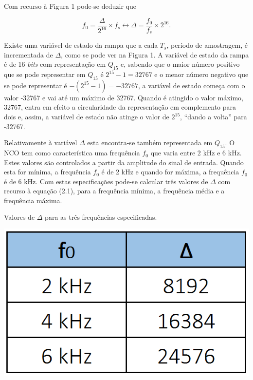 \documentclass[11pt]{article}
\numberwithin{equation}{section}
\begin{document}
Com recurso à Figura 1 pode-se deduzir que

\vspace{-3mm}
\begin{equation}
f_{0} = \frac{\Delta}{2^{16}} \times f_{s} \leftrightarrow \Delta = \frac{f_{0}}{f_{s}} \times 2^{16}.
\end{equation}

\vspace{1mm}
Existe uma variável de estado da rampa que a cada $T_{s}$, período de amostragem, é incrementada de $\Delta$, como se pode ver na Figura 1. A variável de estado da rampa é de 16 \textit{bits} com representação em $Q_{15}$ e, sabendo que o maior número positivo que se pode representar em $Q_{15}$ é $2^{15} - 1 = 32767$ e o menor número negativo que se pode representar é  $-(2^{15} - 1) = -32767$, a variável de estado começa com o valor -32767 e vai até um máximo de 32767. Quando é atingido o valor máximo, 32767, entra em efeito a circularidade da representação em complemento para dois e, assim, a variável de estado não atinge o valor de $2^{15}$, ``dando a volta'' para -32767. 

Relativamente à variável $\Delta$ esta encontra-se também representada em $Q_{15}$. O NCO tem como característica uma frequência $f_{0}$ que varia entre 2 kHz e 6 kHz. Estes valores são controlados a partir da amplitude do sinal de entrada. Quando esta for mínima, a frequência $f_{0}$ é de 2 kHz e quando for máxima, a frequência $f_{0}$ é de 6 kHz. Com estas especificações pode-se calcular três valores de $\Delta$ com recurso à equação (2.1), para a frequência mínima, a frequência média e a frequência máxima.

\begin{table}[H]
	\centering
	\caption{Valores de $\Delta$ para as três frequências especificadas.}
	\vspace{-1.5mm}
	\includegraphics[keepaspectratio=true, scale=0.45]{tabelas/tabela2}
\end{table}
\end{document}
